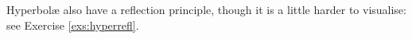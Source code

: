 Hyperbolæ also have a reflection principle, though it is a little harder to visualise: see Exercise \ref{exs:hyperrefl}.
% 
% 
% 
% 


\vfil\vfil


\pagebreak[4]


